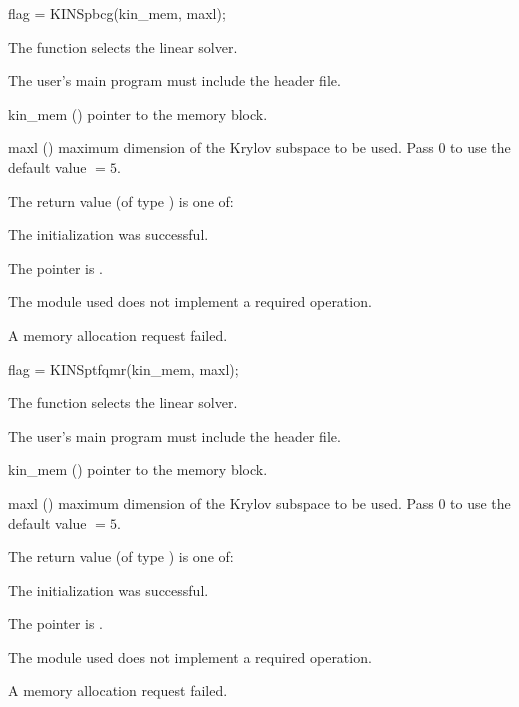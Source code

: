 {}
{
  flag = KINSpbcg(kin\_mem, maxl);
}
{
  The function  selects the {\kinspbcg} linear solver.

  The user's main program must include the  header file.
}
{
  \begin{args}
  \item[kin\_mem] ()
    pointer to the {\kinsol} memory block.
  \item[maxl] ()
    maximum dimension of the Krylov subspace to be used. Pass $0$ to use the 
    default value $=5$.
  \end{args}
}
{
  The return value  (of type ) is one of:
  \begin{args}
  \item[\Id{KINSPILS\_SUCCESS}] 
    The {\kinspbcg} initialization was successful.
  \item[\Id{KINSPILS\_MEM\_NULL}]
    The  pointer is .
  \item[\Id{KINSPILS\_ILL\_INPUT}]
    The {\nvector} module used does not implement a required operation.
  \item[\Id{KINSPILS\_MEM\_FAIL}]
    A memory allocation request failed.
  \end{args}
}
{}
{
  flag = KINSptfqmr(kin\_mem, maxl);
}
{
  The function  selects the {\kinsptfqmr} linear solver.

  The user's main program must include the  header file.
}
{
  \begin{args}
  \item[kin\_mem] ()
    pointer to the {\kinsol} memory block.
  \item[maxl] ()
    maximum dimension of the Krylov subspace to be used. Pass $0$ to use the 
    default value $=5$.
  \end{args}
}
{
  The return value  (of type ) is one of:
  \begin{args}
  \item[\Id{KINSPILS\_SUCCESS}] 
    The {\kinsptfqmr} initialization was successful.
  \item[\Id{KINSPILS\_MEM\_NULL}]
    The  pointer is .
  \item[\Id{KINSPILS\_ILL\_INPUT}]
    The {\nvector} module used does not implement a required operation.
  \item[\Id{KINSPILS\_MEM\_FAIL}]
    A memory allocation request failed.
  \end{args}
}
{}

